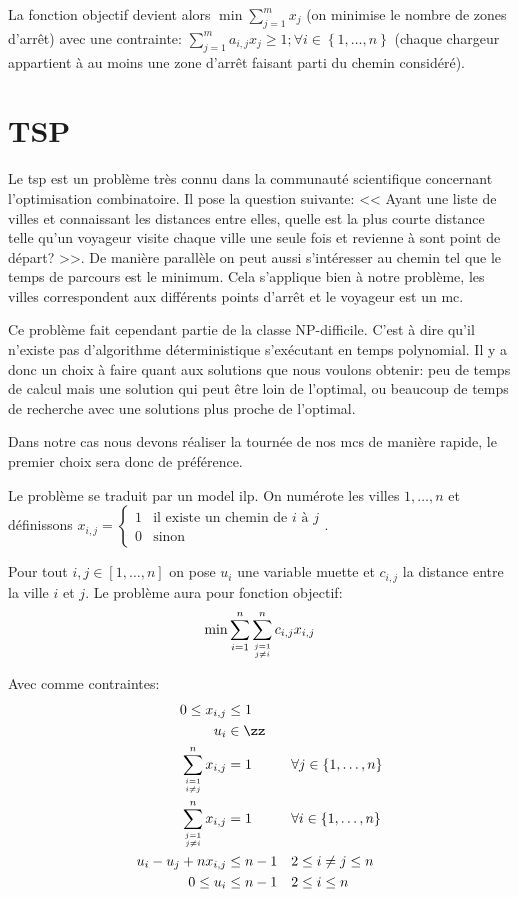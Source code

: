 \documentclass[final]{polytech/polytech}
\begin{document}
		 La fonction objectif devient alors $\min\sum_{j=1}^mx_j$ (on minimise le nombre de zones d'arrêt) avec une contrainte: $\sum_{j=1}^ma_{i,j}x_j\geq 1; \forall i\in \left\{1, \dots ,n\right\}$ (chaque chargeur appartient à au moins une zone d'arrêt faisant parti du chemin considéré).
		 
	\section{TSP}
		Le \gls{tsp} \cite{wiki:tsp} est un problème très connu dans la communauté scientifique concernant l'optimisation combinatoire.
		Il pose la question suivante: << Ayant une liste de villes et connaissant les distances entre elles, quelle est la plus courte distance telle qu'un voyageur visite chaque ville une seule fois et revienne à sont point de départ? >>.
		De manière parallèle on peut aussi s'intéresser au chemin tel que le temps de parcours est le minimum.
		Cela s'applique bien à notre problème, les villes correspondent aux différents points d'arrêt et le voyageur est un \gls{mc}.
		
		Ce problème fait cependant partie de la classe NP-difficile.
		C'est à dire qu'il n'existe pas d'algorithme déterministique s'exécutant en temps polynomial.
		Il y a donc un choix à faire quant aux solutions que nous voulons obtenir: peu de temps de calcul mais une solution qui peut être loin de l'optimal, ou beaucoup de temps de recherche avec une solutions plus proche de l'optimal.
		
		Dans notre cas nous devons réaliser la tournée de nos \glspl{mc} de manière rapide, le premier choix sera donc de préférence.
		
		Le problème se traduit par un model \gls{ilp}.
		On numérote les villes $1, \dots, n$ et définissons $x_{i,j}=\left\{\begin{array}{ll}
				1 & \text{il existe un chemin de } i \text{ à }j\\
				0 & \text{sinon}
			\end{array}\right.$.
			
		Pour tout $i,j\in\left[1,\dots,n\right]$ on pose $u_i$ une variable muette et $c_{i,j}$ la distance entre la ville $i$ et $j$.
		Le problème aura pour fonction objectif:
		\begin{align}
			\label{eq:eq1}
			\min\sum_{i=1}^n\sum_{j=1\atop j\neq i}^n c_{i,j}x_{i,j}
		\end{align}
		
		Avec comme contraintes:
		\begin{align}
			\label{eq:eq2}
			0 \leq x_{i,j} &\leq 1 &&\\
			u_i&\in\zz &&\nonumber \\
			\label{eq:eq3}
			\sum_{i=1\atop i\neq j}^n x_{i,j} &= 1 && \forall j\in \left\{ 1, \dots , n\right\}\\
			\label{eq:eq4}
			\sum_{j=1\atop j\neq i}^n x_{i,j} &= 1 && \forall i\in \left\{ 1, \dots , n\right\}\\
			\label{eq:eq5}
			u_i-u_j+nx_{i,j}&\leq n-1 && 2\leq i\neq j\leq n \\
			\label{eq:eq6}
			0\leq u_i &\leq n-1 && 2\leq i\leq n
		\end{align}
		
\end{document}
